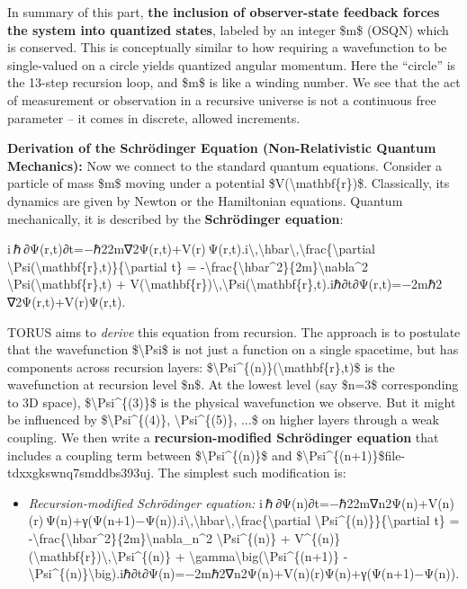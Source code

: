\documentclass[]{article}
\begin{document}
In summary of this part, \textbf{the inclusion of observer-state
feedback forces the system into quantized states}, labeled by an integer
\$m\$ (OSQN) which is conserved. This is conceptually similar to how
requiring a wavefunction to be single-valued on a circle yields
quantized angular momentum. Here the ``circle'' is the 13-step recursion
loop, and \$m\$ is like a winding number​. We see that the act of
measurement or observation in a recursive universe is not a continuous
free parameter -- it comes in discrete, allowed increments.

\textbf{Derivation of the Schrödinger Equation (Non-Relativistic Quantum
Mechanics):} Now we connect to the standard quantum equations. Consider
a particle of mass \$m\$ moving under a potential
\$V(\textbackslash{}mathbf\{r\})\$. Classically, its dynamics are given
by Newton or the Hamiltonian equations. Quantum mechanically, it is
described by the \textbf{Schrödinger equation}:

i ℏ ∂Ψ(r,t)∂t=−ℏ22m∇2Ψ(r,t)+V(r) Ψ(r,t).i\textbackslash{},\textbackslash{}hbar\textbackslash{},\textbackslash{}frac\{\textbackslash{}partial
\textbackslash{}Psi(\textbackslash{}mathbf\{r\},t)\}\{\textbackslash{}partial
t\} =
-\textbackslash{}frac\{\textbackslash{}hbar\^{}2\}\{2m\}\textbackslash{}nabla\^{}2
\textbackslash{}Psi(\textbackslash{}mathbf\{r\},t) +
V(\textbackslash{}mathbf\{r\})\textbackslash{},\textbackslash{}Psi(\textbackslash{}mathbf\{r\},t).iℏ∂t∂Ψ(r,t)​=−2mℏ2​∇2Ψ(r,t)+V(r)Ψ(r,t).

TORUS aims to \emph{derive} this equation from recursion. The approach
is to postulate that the wavefunction \$\textbackslash{}Psi\$ is not
just a function on a single spacetime, but has components across
recursion layers:
\$\textbackslash{}Psi\^{}\{(n)\}(\textbackslash{}mathbf\{r\},t)\$ is the
wavefunction at recursion level \$n\$. At the lowest level (say \$n=3\$
corresponding to 3D space), \$\textbackslash{}Psi\^{}\{(3)\}\$ is the
physical wavefunction we observe. But it might be influenced by
\$\textbackslash{}Psi\^{}\{(4)\}, \textbackslash{}Psi\^{}\{(5)\}, ...\$
on higher layers through a weak coupling. We then write a
\textbf{recursion-modified Schrödinger equation} that includes a
coupling term between \$\textbackslash{}Psi\^{}\{(n)\}\$ and
\$\textbackslash{}Psi\^{}\{(n+1)\}\$​file-tdxxgkswnq7smddbs393uj. The
simplest such modification is:

\begin{itemize}
\item
  \emph{Recursion-modified Schrödinger equation:}
  i ℏ ∂Ψ(n)∂t=−ℏ22m∇n2Ψ(n)+V(n)(r) Ψ(n)+γ(Ψ(n+1)−Ψ(n)).i\textbackslash{},\textbackslash{}hbar\textbackslash{},\textbackslash{}frac\{\textbackslash{}partial
  \textbackslash{}Psi\^{}\{(n)\}\}\{\textbackslash{}partial t\} =
  -\textbackslash{}frac\{\textbackslash{}hbar\^{}2\}\{2m\}\textbackslash{}nabla\_n\^{}2
  \textbackslash{}Psi\^{}\{(n)\} +
  V\^{}\{(n)\}(\textbackslash{}mathbf\{r\})\textbackslash{},\textbackslash{}Psi\^{}\{(n)\}
  +
  \textbackslash{}gamma\textbackslash{}big(\textbackslash{}Psi\^{}\{(n+1)\}
  -
  \textbackslash{}Psi\^{}\{(n)\}\textbackslash{}big).iℏ∂t∂Ψ(n)​=−2mℏ2​∇n2​Ψ(n)+V(n)(r)Ψ(n)+γ(Ψ(n+1)−Ψ(n)).
\end{itemize}
\end{document}
